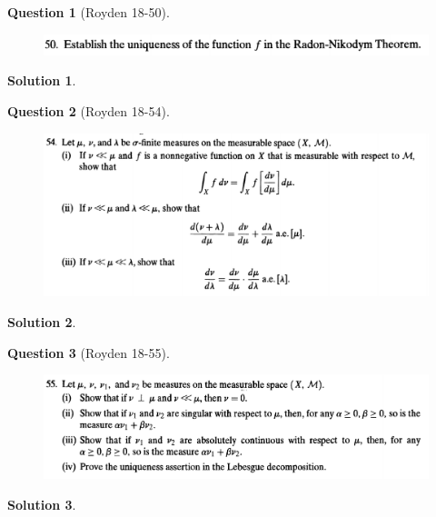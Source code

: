 \documentclass{article} %
\theoremstyle{quest}
\newtheorem*{question}{Question}
\newtheorem*{solution}{Solution}
\begin{document}
\newpage

\begin{question}[Royden 18-50]
\hfill
\begin{figure}[h!]
  \centering
    \includegraphics[width=1\textwidth]{rv-18-50.png}
\end{figure}
\end{question}
\begin{solution}
\end{solution}

\newpage

\begin{question}[Royden 18-54]
\hfill
\begin{figure}[h!]
  \centering
    \includegraphics[width=1\textwidth]{rv-18-54.png}
\end{figure}
\end{question}
\begin{solution}
\end{solution}
\newpage

\begin{question}[Royden 18-55]
\hfill
\begin{figure}[h!]
  \centering
    \includegraphics[width=1\textwidth]{rv-18-55.png}
\end{figure}
\end{question}
\begin{solution}
\end{solution}
\end{document}

